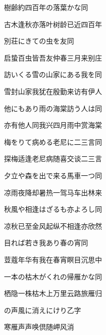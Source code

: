 \begin{haiku}
    {\FH 樹齢約四百年の落葉かな}\hfill{\FH 同}

    {\FK 古木逢秋亦落叶树龄已近四百年}
\end{haiku}

\begin{haiku}
    {\FH 別荘にきての虫を友}\hfill{\FH 同}

    {\FK 启蛰百虫皆吾友仲春三月来别庄}
\end{haiku}

\begin{haiku}
    {\FH 訪いくる雪の山家にある我を}\hfill{\FH 同}

    {\FK 雪封山家我犹在殷勤来访有伊人}
\end{haiku}

\begin{haiku}
    {\FH 他にもあり雨の海棠訪う人は}\hfill{\FH 同}

    {\FK 亦有他人同我兴四月雨中赏海棠}
\end{haiku}

\begin{haiku}
    {\FH 梅をりて病める老尼に二三言}\hfill{\FH 同}

    {\FK 探梅适逢老尼病随喜交谈二三言}
\end{haiku}

\begin{haiku}
    {\FH 夕立や森を出で来る馬車一つ}\hfill{\FH 同}

    {\FK 凉雨夜降却暑热一驾马车出林来}
\end{haiku}

\begin{haiku}
    {\FH 秋風や相逢はざるも亦よろし}\hfill{\FH 同}

    {\FK 凉秋已至金风起纵不相逢亦欣然}
\end{haiku}

\begin{haiku}
    {\FH 目れば若き我あり春の宵}\hfill{\FH 同}

    {\FK 荳蔻年华有我在春宵瞑目沉思中}
\end{haiku}

\begin{haiku}
    {\FH 一本の枯木がくれの帰雁かな}\hfill{\FH 同}

    {\FK 栖隐一株枯木上万里云路旅雁归}
\end{haiku}

\begin{haiku}
    {\FH {}の声風に消えにけり}\hfill{\FH 乙字}

    {\FK 寒雁声声唤倶随岬风消}
\end{haiku}

